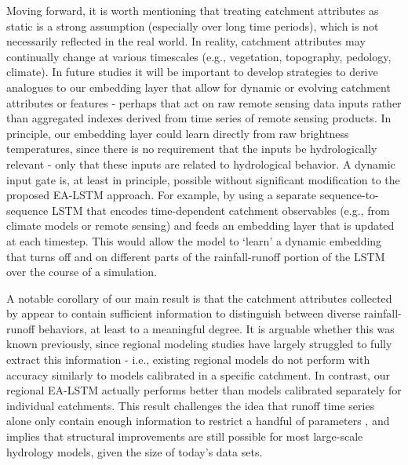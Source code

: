 Moving forward, it is worth mentioning that treating catchment attributes as static is a strong assumption (especially over long time periods), which is not necessarily reflected in the real world. In reality, catchment attributes may continually change at various timescales (e.g., vegetation, topography, pedology, climate). In future studies it will be important to develop strategies to derive analogues to our embedding layer that allow for dynamic or evolving catchment attributes or features - perhaps that act on raw remote sensing data inputs rather than aggregated indexes derived from time series of remote sensing products. In principle, our embedding layer could learn directly from raw brightness temperatures, since there is no requirement that the inputs be hydrologically relevant - only that these inputs are related to hydrological behavior. A dynamic input gate is, at least in principle, possible without significant modification to the proposed \gls{EA-LSTM} approach. For example, by using a separate sequence-to-sequence \gls{LSTM} that encodes time-dependent catchment observables (e.g., from climate models or remote sensing) and feeds an embedding layer that is updated at each timestep. This would allow the model to `learn’ a dynamic embedding that turns off and on different parts of the rainfall-runoff portion of the \gls{LSTM} over the course of a simulation.

A notable corollary of our main result is that the catchment attributes collected by \citet{addor2017large} appear to contain sufficient information to distinguish between diverse rainfall-runoff behaviors, at least to a meaningful degree. It is arguable whether this was known previously, since regional modeling studies have largely struggled to fully extract this information \citep{mizukami2017towards} - i.e., existing regional models do not perform with accuracy similarly to models calibrated in a specific catchment. In contrast, our regional \gls{EA-LSTM} actually performs better than models calibrated separately for individual catchments. This result challenges the idea that runoff time series alone only contain enough information to restrict a handful of parameters \citep{naef1981can, jakeman1993how, perrin2001does, kirchner2006getting}, and implies that structural improvements are still possible for most large-scale hydrology models, given the size of today's data sets.


